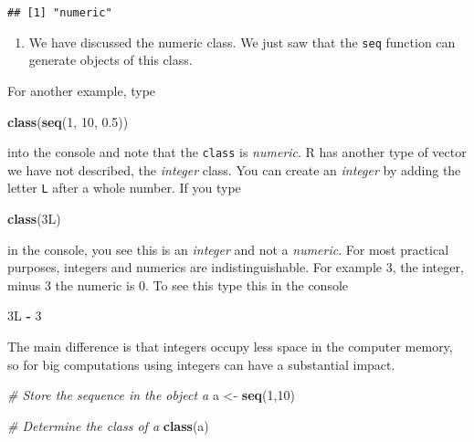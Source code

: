 \documentclass[
]{article}
\newenvironment{Shaded}{\begin{snugshade}}{\end{snugshade}}
\newcommand{\CommentTok}[1]{\textcolor[rgb]{0.56,0.35,0.01}{\textit{#1}}}
\newcommand{\DecValTok}[1]{\textcolor[rgb]{0.00,0.00,0.81}{#1}}
\newcommand{\FloatTok}[1]{\textcolor[rgb]{0.00,0.00,0.81}{#1}}
\newcommand{\KeywordTok}[1]{\textcolor[rgb]{0.13,0.29,0.53}{\textbf{#1}}}
\newcommand{\NormalTok}[1]{#1}
\newcommand{\OperatorTok}[1]{\textcolor[rgb]{0.81,0.36,0.00}{\textbf{#1}}}
\newcommand{\StringTok}[1]{\textcolor[rgb]{0.31,0.60,0.02}{#1}}
\providecommand{\tightlist}{%
  \setlength{\itemsep}{0pt}\setlength{\parskip}{0pt}}
\begin{document}
\begin{verbatim}
## [1] "numeric"
\end{verbatim}

\begin{enumerate}
\def\labelenumi{\arabic{enumi}.}
\setcounter{enumi}{9}
\tightlist
\item
  We have discussed the numeric class. We just saw that the \texttt{seq}
  function can generate objects of this class.
\end{enumerate}

For another example, type

\begin{Shaded}
\begin{Highlighting}[]
\KeywordTok{class}\NormalTok{(}\KeywordTok{seq}\NormalTok{(}\DecValTok{1}\NormalTok{, }\DecValTok{10}\NormalTok{, }\FloatTok{0.5}\NormalTok{))}
\end{Highlighting}
\end{Shaded}

into the console and note that the \texttt{class} is \emph{numeric}. R
has another type of vector we have not described, the \emph{integer}
class. You can create an \emph{integer} by adding the letter \texttt{L}
after a whole number. If you type

\begin{Shaded}
\begin{Highlighting}[]
\KeywordTok{class}\NormalTok{(3L)}
\end{Highlighting}
\end{Shaded}

in the console, you see this is an \emph{integer} and not a
\emph{numeric}. For most practical purposes, integers and numerics are
indistinguishable. For example 3, the integer, minus 3 the numeric is 0.
To see this type this in the console

\begin{Shaded}
\begin{Highlighting}[]
\NormalTok{3L }\OperatorTok{-}\StringTok{ }\DecValTok{3}
\end{Highlighting}
\end{Shaded}

The main difference is that integers occupy less space in the computer
memory, so for big computations using integers can have a substantial
impact.

\begin{Shaded}
\begin{Highlighting}[]
\CommentTok{# Store the sequence in the object a}
\NormalTok{a <-}\StringTok{ }\KeywordTok{seq}\NormalTok{(}\DecValTok{1}\NormalTok{,}\DecValTok{10}\NormalTok{)}

\CommentTok{# Determine the class of a}
\KeywordTok{class}\NormalTok{(a)}
\end{Highlighting}
\end{Shaded}
\end{document}
